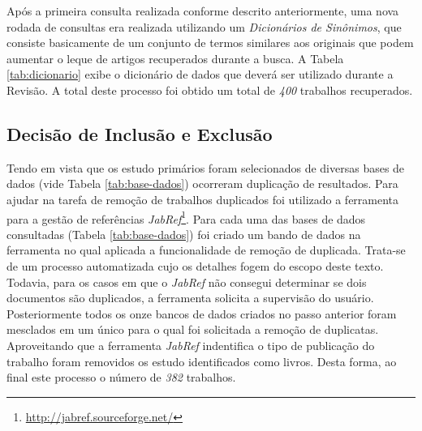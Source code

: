 \documentclass[12pt]{article}
\begin{document}
Após a primeira consulta realizada conforme descrito anteriormente, uma nova
rodada de consultas era realizada utilizando um \textit{Dicionários de Sinônimos}, que consiste basicamente de um conjunto de
termos similares aos originais que podem aumentar o leque de artigos
recuperados durante a busca. A Tabela \ref{tab:dicionario} exibe o dicionário
de dados que deverá ser utilizado durante a Revisão. A total deste processo foi
obtido um total de \textit{400} trabalhos recuperados.

\begin{table}[ht]
\centering
{}
\caption{Dicionário de Sinônimos}
\label{tab:dicionario}
\end{table}

\subsection{Decisão de Inclusão e Exclusão}
\label{subsec:decisao-inclusao}

Tendo em vista que os estudo primários foram selecionados de diversas bases de
dados (vide Tabela \ref{tab:base-dados}) ocorreram duplicação de
resultados. Para ajudar na tarefa de remoção de trabalhos duplicados foi utilizado a
ferramenta para a gestão de referências
\textit{JabRef}\footnote{\url{http://jabref.sourceforge.net/}}. Para cada uma
das bases de dados consultadas (Tabela \ref{tab:base-dados}) foi criado um
bando de dados na ferramenta no qual aplicada a funcionalidade de remoção de
duplicada. Trata-se de um processo automatizada cujo os detalhes fogem do
escopo deste texto. Todavia, para os casos em que o \textit{JabRef} não
consegui determinar se dois documentos são duplicados, a ferramenta solicita a
supervisão do usuário. Posteriormente todos os onze bancos de dados criados no
passo anterior foram mesclados em um único para o qual foi solicitada a remoção
de duplicatas. Aproveitando que a ferramenta \textit{JabRef} indentifica o tipo
de publicação do trabalho foram removidos os estudo identificados como livros.
Desta forma, ao final este processo o número de \textit{382} trabalhos.
\end{document}
